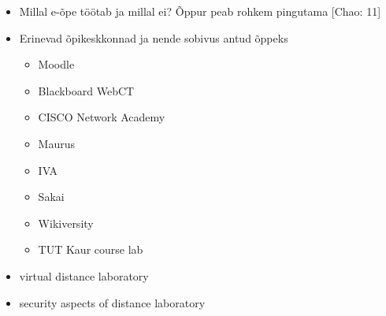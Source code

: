 \begin{itemize}
	\item Millal e-õpe töötab ja millal ei? Õppur peab rohkem pingutama [Chao: 11]
	\item Erinevad õpikeskkonnad ja nende sobivus antud õppeks
		\begin{itemize}
			\item Moodle
			\item Blackboard WebCT
			\item CISCO Network Academy
			\item Maurus
			\item IVA
			\item Sakai
			\item Wikiversity
			\item TUT Kaur course lab
		\end{itemize}
	\item virtual distance laboratory
	\item security aspects of distance laboratory
\end{itemize}



